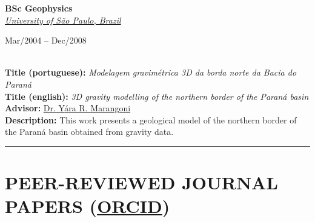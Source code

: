\documentclass[11pt,a4paper,onecolumn]{article}
\begin{document}
\medskip

\noindent \textbf{\Large BSc Geophysics} \\
\noindent \href{https://www.iag.usp.br/international/}{\textsl{University of S\~{a}o Paulo, Brazil}} \hfill \parbox{0.25\textwidth}{\raggedleft Mar/2004 -- Dec/2008} \vspace{0.3\baselineskip} \\
\noindent \textbf{Title (portuguese):} \textit{Modelagem gravim\'{e}trica 3D da borda norte da Bacia do Paran\'{a}} \\
\noindent \textbf{Title (english):} \textit{3D gravity modelling of the northern border of the Paran\'{a} basin} \\
\noindent \textbf{Advisor:} \href{https://orcid.org/0000-0003-4329-1787}{Dr. Y{\'a}ra R. Marangoni} \\
\noindent \textbf{Description:} This work presents a geological model of the northern border of the Paran\'{a} basin obtained from gravity data. \\

\pagebreak \hrule


\section*{PEER-REVIEWED JOURNAL PAPERS (\href{https://orcid.org/0000-0002-6338-4086}{ORCID})}
\end{document}
